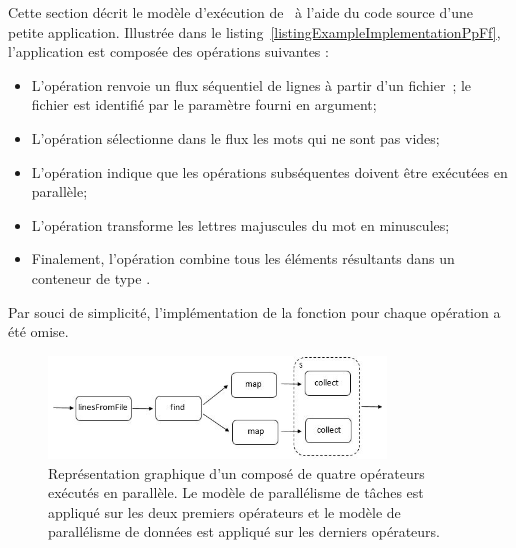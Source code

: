 Cette section d\'ecrit le mod\`ele d'ex\'ecution de \ppff\ \`a l'aide du code source d'une petite application. Illustr\'ee dans le listing~\ref{listingExampleImplementationPpFf}, l'application est compos\'ee des op\'erations suivantes :
\begin{itemize}
	\item L'opération  renvoie un flux séquentiel de lignes à partir d'un fichier~; le fichier est identifi\'e par le paramètre  fourni en argument;

	\item L'op\'eration  s\'electionne dans le flux les mots qui ne sont pas vides;

	\item L'op\'eration  indique que les op\'erations subs\'equentes doivent \^etre ex\'ecut\'ees en parall\`ele;
	
	\item L'op\'eration  transforme les lettres majuscules du mot en minuscules;
	
	\item Finalement, l'op\'eration  combine tous les \'el\'ements r\'esultants dans un conteneur de type .
\end{itemize}

Par souci de simplicit\'e, l'impl\'ementation de la fonction pour chaque op\'eration a \'et\'e omise.
%


\begin{figure}[ht]
\centering
     \includegraphics[width=0.8\textwidth]{Figures/ExempleRuntimeExecution.jpg}
      \caption[Repr\'esentation graphique d'un  compos\'e de quatre op\'erateurs.]{Repr\'esentation graphique d'un  compos\'e de quatre op\'erateurs ex\'ecut\'es en parall\`ele. Le mod\`ele de parall\'elisme de t\^aches est appliqu\'e sur les deux premiers op\'erateurs et le mod\`ele de parall\'elisme de donn\'ees est appliqu\'e sur les derniers op\'erateurs.}
       \label{ExempleRuntimeExecution.fig}
\end{figure}



